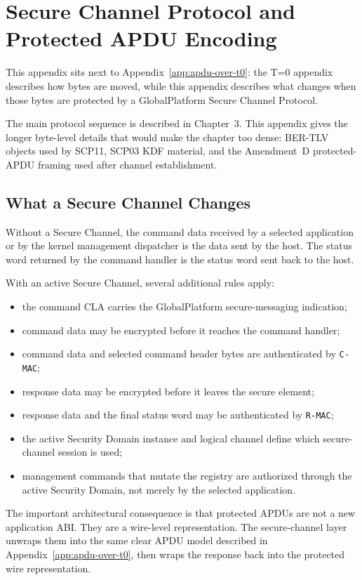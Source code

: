 \chapter{Secure Channel Protocol and Protected APDU Encoding}
\label{app:scp-data-objects}

This appendix sits next to Appendix~\ref{app:apdu-over-t0}: the T=0 appendix
describes how bytes are moved, while this appendix describes what changes when
those bytes are protected by a GlobalPlatform Secure Channel Protocol.

The main protocol sequence is described in Chapter~3. This appendix gives the
longer byte-level details that would make the chapter too dense: BER-TLV
objects used by SCP11, SCP03 KDF material, and the Amendment~D protected-APDU
framing used after channel establishment.

\section{What a Secure Channel Changes}

Without a Secure Channel, the command data received by a selected application
or by the kernel management dispatcher is the data sent by the host. The status
word returned by the command handler is the status word sent back to the host.

With an active Secure Channel, several additional rules apply:
\begin{itemize}
\item the command CLA carries the GlobalPlatform secure-messaging indication;
\item command data may be encrypted before it reaches the command handler;
\item command data and selected command header bytes are authenticated by
      \texttt{C-MAC};
\item response data may be encrypted before it leaves the secure element;
\item response data and the final status word may be authenticated by
      \texttt{R-MAC};
\item the active Security Domain instance and logical channel define which
      secure-channel session is used;
\item management commands that mutate the registry are authorized through the
      active Security Domain, not merely by the selected application.
\end{itemize}

The important architectural consequence is that protected APDUs are not a new
application ABI. They are a wire-level representation. The secure-channel layer
unwraps them into the same clear APDU model described in
Appendix~\ref{app:apdu-over-t0}, then wraps the response back into the protected
wire representation.

